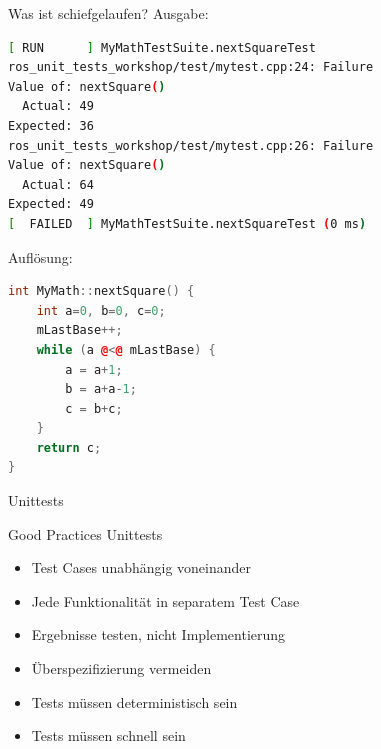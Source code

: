 \documentclass{beamer}
\begin{document}
\begin{frame}[fragile]{Was ist schiefgelaufen?}
Ausgabe:
\begin{lstlisting}[language=bash, numbers=none]
[ RUN      ] MyMathTestSuite.nextSquareTest
ros_unit_tests_workshop/test/mytest.cpp:24: Failure
Value of: nextSquare()
  Actual: 49
Expected: 36
ros_unit_tests_workshop/test/mytest.cpp:26: Failure
Value of: nextSquare()
  Actual: 64
Expected: 49
[  FAILED  ] MyMathTestSuite.nextSquareTest (0 ms)
\end{lstlisting}
\pause
Auflösung:
\begin{lstlisting}[language=c++, style=using_colors]
int MyMath::nextSquare() {
	int a=0, b=0, c=0;
	mLastBase++;
	while (a @<@ mLastBase) {
		a = a+1;
		b = a+a-1;
		c = b+c;
	}
	return c;
}
\end{lstlisting}
\end{frame}

\begin{frame}{Unittests}
	\begin{block}{Good Practices Unittests}
	\begin{itemize}
		\item Test Cases unabhängig voneinander
		\item Jede Funktionalität in separatem Test Case
		\item Ergebnisse testen, nicht Implementierung
		\item Überspezifizierung vermeiden
		\item Tests müssen deterministisch sein
		\item Tests müssen schnell sein
	\end{itemize}
	\end{block}
\end{frame}
\end{document}
